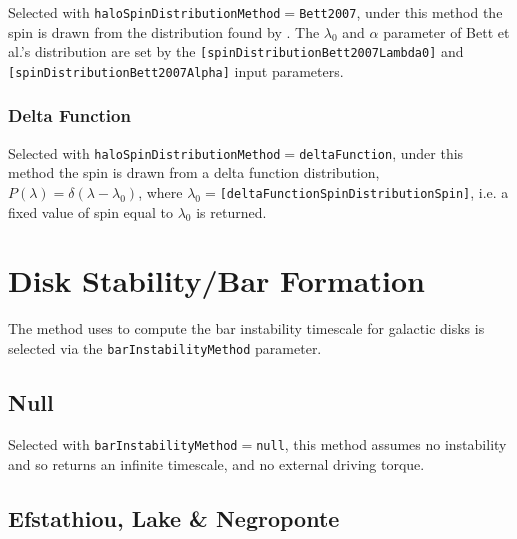 Selected with {\tt haloSpinDistributionMethod}$=${\tt Bett2007}, under this method the spin is drawn from the distribution found by \cite{bett_spin_2007}. The $\lambda_0$ and $\alpha$ parameter of Bett et al.'s distribution are set by the {\tt [spinDistributionBett2007Lambda0]} and {\tt [spinDistributionBett2007Alpha]} input parameters.

\subsubsection{Delta Function}

Selected with {\tt haloSpinDistributionMethod}$=${\tt deltaFunction}, under this method the spin is drawn from a delta function distribution, $P(\lambda) = \delta(\lambda-\lambda_0)$, where $\lambda_0=${\tt [deltaFunctionSpinDistributionSpin]}, i.e. a fixed value of spin equal to $\lambda_0$ is returned.

\section{Disk Stability/Bar Formation}\label{sec:DiskStability}

The method uses to compute the bar instability timescale for galactic disks is selected via the {\tt barInstabilityMethod} parameter.

\subsection{Null}

Selected with {\tt barInstabilityMethod}$=${\tt null}, this method assumes no instability and so returns an infinite timescale, and no external driving torque.

\subsection{Efstathiou, Lake \& Negroponte}

